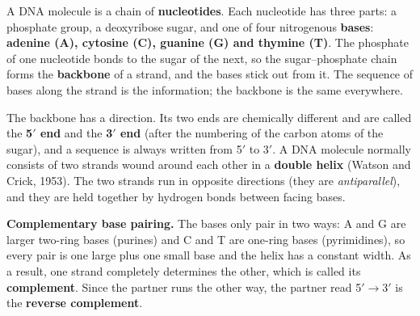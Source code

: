 A DNA molecule is a chain of \textbf{nucleotides}. Each nucleotide has three parts: a phosphate group, a deoxyribose sugar, and one of four nitrogenous \textbf{bases}: \textbf{adenine (A), cytosine (C), guanine (G) and thymine (T)}. The phosphate of one nucleotide bonds to the sugar of the next, so the sugar--phosphate chain forms the \textbf{backbone} of a strand, and the bases stick out from it. The sequence of bases along the strand is the information; the backbone is the same everywhere.

The backbone has a direction. Its two ends are chemically different and are called the \textbf{5$'$ end} and the \textbf{3$'$ end} (after the numbering of the carbon atoms of the sugar), and a sequence is always written from 5$'$ to 3$'$. A DNA molecule normally consists of two strands wound around each other in a \textbf{double helix} (Watson and Crick, 1953). The two strands run in opposite directions (they are \emph{antiparallel}), and they are held together by hydrogen bonds between facing bases.

\textbf{Complementary base pairing.} The bases only pair in two ways:  A and G are larger two-ring bases (purines) and C and T are one-ring bases (pyrimidines), so every pair is one large plus one small base and the helix has a constant width. As a result, one strand completely determines the other, which is called its \textbf{complement}. Since the partner runs the other way, the partner read 5$'\to$3$'$ is the \textbf{reverse complement}.

\begin{center}
\end{center}

